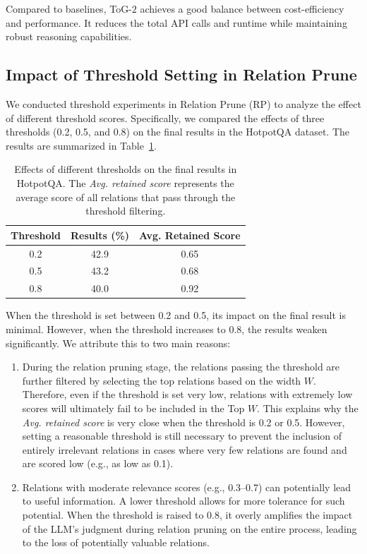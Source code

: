 \documentclass{article} %
\begin{document}
Compared to baselines, ToG-$2$ achieves a good balance between cost-efficiency and performance. It reduces the total API calls and runtime while maintaining robust reasoning capabilities.


\subsection{Impact of Threshold Setting in Relation Prune}
We conducted threshold experiments in Relation Prune (RP) to analyze the effect of different threshold scores. Specifically, we compared the effects of three thresholds (0.2, 0.5, and 0.8) on the final results in the HotpotQA dataset. The results are summarized in Table~\ref{tab:thresholds}.
\begin{table}[h]
\centering
\renewcommand{\arraystretch}{1}  %
\setlength{\tabcolsep}{12pt}       %
\begin{tabular}{ccc}
\toprule
\textbf{Threshold} & \textbf{Results (\%)} & \textbf{Avg. Retained Score} \\
\midrule
0.2 & 42.9 & 0.65 \\
0.5 & 43.2 & 0.68 \\
0.8 & 40.0 & 0.92 \\
\bottomrule
\end{tabular}
\caption{Effects of different thresholds on the final results in HotpotQA. The \textit{Avg. retained score} represents the average score of all relations that pass through the threshold filtering.}
\label{tab:thresholds}
\end{table}



When the threshold is set between 0.2 and 0.5, its impact on the final result is minimal. However, when the threshold increases to 0.8, the results weaken significantly. We attribute this to two main reasons:

\begin{enumerate}
    \item During the relation pruning stage, the relations passing the threshold are further filtered by selecting the top relations based on the width \(W\). Therefore, even if the threshold is set very low, relations with extremely low scores will ultimately fail to be included in the Top \(W\). This explains why the \textit{Avg. retained score} is very close when the threshold is 0.2 or 0.5. However, setting a reasonable threshold is still necessary to prevent the inclusion of entirely irrelevant relations in cases where very few relations are found and are scored low (e.g., as low as 0.1).
    
    \item Relations with moderate relevance scores (e.g., 0.3--0.7) can potentially lead to useful information. A lower threshold allows for more tolerance for such potential. When the threshold is raised to 0.8, it overly amplifies the impact of the LLM’s judgment during relation pruning on the entire process, leading to the loss of potentially valuable relations.
\end{enumerate}
\end{document}
